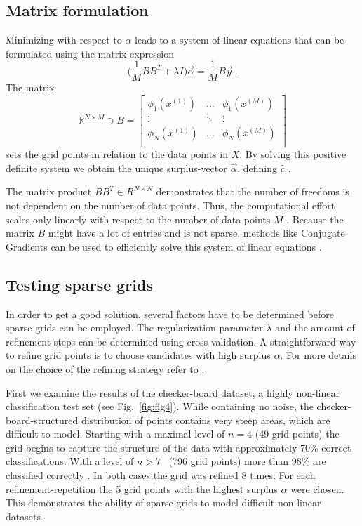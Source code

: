 \subsection{Matrix formulation}
Minimizing with respect to $\alpha$ leads to a system of linear equations that
can be formulated using the matrix expression
$$\Big(\frac{1}{M} BB^T + \lambda I \Big)\vec{\alpha} = \frac{1}{M}B\vec{y} \
.$$
The matrix
$$ \mathbb{R}^{N \times M} \ni B =
\begin{bmatrix}
  \phi_1(x^{(1)}) & \dots & \phi_1(x^{(M)}) \\
  \vdots & \ddots & \vdots \\
  \phi_N(x^{(1)}) & \dots  & \phi_N(x^{(M)}) \\
\end{bmatrix}
$$
sets the grid points in relation to the data points in $X$. By solving this
positive definite system we obtain the unique surplus-vector
$\vec{\alpha}$, defining $\hat{c}$ \cite{disshei}.
\par
The
matrix product $BB^T \in R^{N \times N}$ demonstrates that the number of freedoms
is not dependent on the number of data points. Thus, the computational effort
scales only linearly with respect to the number of data points $M$ \cite{disspfl}. Because
the matrix $B$ might have a lot of entries and is not sparse, methods like
Conjugate Gradients can be used to efficiently solve this system
of linear equations \cite{disshei}.

\subsection{Testing sparse grids}\label{subsec:test}
In order to get a good solution, several factors have to be determined before
sparse grids can be employed. The regularization parameter $\lambda$ and the
amount of refinement steps can be determined using cross-validation.
A straightforward way to refine grid points is to choose candidates
with high surplus $\alpha$. %
For more
details on the choice of the refining strategy refer to \cite{disspfl}.
\par
First we examine the results of the checker-board dataset, a highly non-linear
classification test set (see Fig.~\ref{fig:fig4}).
While containing no noise, the checker-board-structured
distribution of points contains very steep areas, which are difficult to model.
Starting with a maximal level of $n=4$ (49 grid points)
the grid begins to capture the structure of the data with approximately
70\% correct classifications.
With a level of $n>7$ \ (796 grid points) more than 98\% are classified
correctly \cite{disspfl}. In both cases the grid was refined 8 times. For each
refinement-repetition the 5 grid points with the highest surplus $\alpha$ were chosen.
This demonstrates the ability of sparse grids
to model difficult non-linear datasets.
\par

